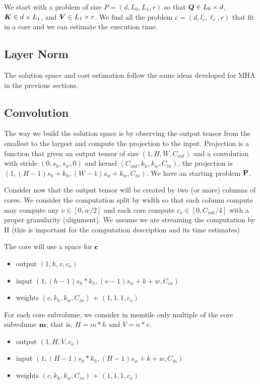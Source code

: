 \documentclass[conference]{IEEEtran}
\begin{document}
We start with a problem of size $P=(d,L_0,L_1,r)$ so that ${\boldsymbol Q} \in
L_0\times d$, ${\boldsymbol K} \in d\times L_1$, and ${\boldsymbol V} \in L_1\times
r$. We find all the problem $c=(d,l_c,\ell_c,r)$ that fit in a core
and we can estimate the execution time.

\subsection{Layer Norm}
The solution space and cost estimation follow the same ideas developed
for MHA in the previous sections.

\subsection{Convolution}
The way we build the solution space is by observing the output tensor
from the smallest to the largest and compute the projection to the
input. Projection is a function that given an output tensor of size
$(1,H,W,C_{out})$ and a convolution with stride $(0, s_h, s_w,0)$ and
kernel $(C_{out}, k_h, k_w,C_{in})$, the projection is $(1,
(H-1)s_h+k_h, (W-1)s_w+k_w,C_{in})$. We have an starting problem ${\bf
  P}$.

Consider now that the output tensor will be created by two (or more)
columns of cores. We consider the computation split by width so that
each column compute may compute any $v \in [0,w/2]$ and each core
compute $c_o \in [0,C_{out}/4]$ with a proper granularity
(alignment). We assume we are streaming the computation by H (this is
important for the computation description and its time estimates)

The core will use a space for ${\bf c}$
\begin{itemize}
  \item output $(1,h,v,c_o)$ 
  \item input  $(1,(h-1)s_h*k_h,(v-1)s_w+k+w,C_{in})$ 
  \item weights $(c,k_h,k_w,C_{in})$ + $(1,1,1,c_o)$ 
\end{itemize}

For each core subvolume, we consider in memtile only multiple of the
core subvolume ${\bf m}$; that is, $H = m*h$ and $V=n*v$.
\begin{itemize}
  \item output $(1,H,V,c_o)$ 
  \item input  $(1,(H-1)s_h*k_h,(H-1)s_w+k+w,C_{in})$ 
  \item weights $(c,k_h,k_w,C_{in})$ + $(1,1,1,c_o)$ 
\end{itemize}
\end{document}
